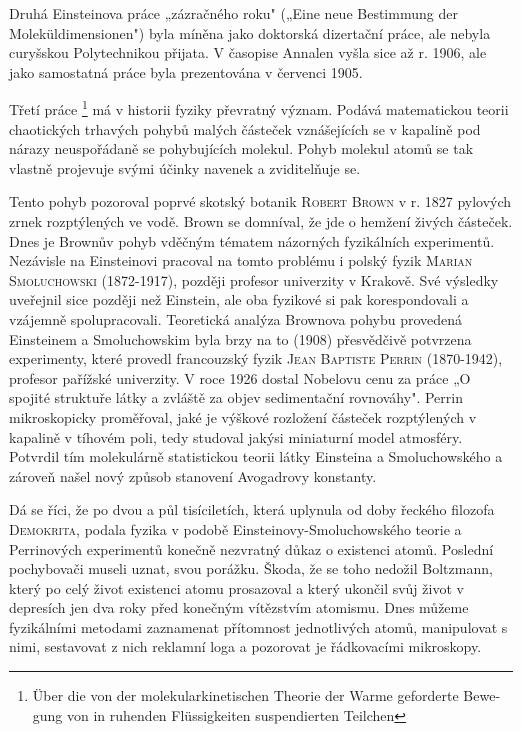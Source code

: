         Druhá Einsteinova práce „zázračného roku"  („Eine neue
        Bestimmung der Moleküldimensionen") byla míněna jako doktorská dizertační práce, ale nebyla
        curyšskou Polytechnikou přijata. V časopise Annalen vyšla sice až r. 1906, ale jako
        samostatná práce byla prezentována v červenci 1905.

        Třetí práce \emph{}\footnote{\foreignlanguage{ngerman}{Über die von der
        molekularkinetischen Theorie der Warme geforderte Bewegung von in ruhenden Flüssigkeiten
        suspendierten Teilchen}} \cite{Einstein1905} má v historii fyziky převratný význam. Podává
        matematickou teorii chaotických trhavých pohybů malých částeček vznášejících se v kapalině
        pod nárazy neuspořádaně se pohybujících molekul. Pohyb molekul atomů se tak vlastně
        projevuje svými účinky navenek a zviditelňuje se.

        Tento pohyb pozoroval poprvé skotský botanik \textsc{Robert Brown} v r. 1827 pylových zrnek
        rozptýlených ve vodě. Brown se domníval, že jde o hemžení živých částeček. Dnes je Brownův
        pohyb vděčným tématem názorných fyzikálních experimentů. Nezávisle na Einsteinovi pracoval
        na tomto problému i polský fyzik \textsc{Marian Smoluchowski} (1872-1917), později profesor
        univerzity v Krakově. Své výsledky uveřejnil sice později než Einstein, ale oba fyzikové si
        pak korespondovali a vzájemně spolupracovali. Teoretická analýza Brownova pohybu provedená
        Einsteinem a Smoluchowskim byla brzy na to (1908) přesvědčivě potvrzena experimenty, které
        provedl francouzský fyzik \textsc{Jean Baptiste Perrin} (1870-1942), profesor pařížské
        univerzity. V roce 1926 dostal Nobelovu cenu za práce „O spojité struktuře látky a zvláště
        za objev sedimentační rovnováhy". Perrin mikroskopicky proměřoval, jaké je výškové rozložení
        částeček rozptýlených v kapalině v tíhovém poli, tedy studoval jakýsi miniaturní model
        atmosféry. Potvrdil tím molekulárně statistickou teorii látky Einsteina a Smoluchowského a
        zároveň našel nový způsob stanovení Avogadrovy konstanty. 
        
        Dá se říci, že po dvou a půl tisíciletích, která uplynula od doby řeckého filozofa
        \textsc{Demokrita}, podala fyzika v podobě Einsteinovy-Smoluchowského teorie a Perrinových
        experimentů konečně nezvratný důkaz o existenci atomů. Poslední pochybovači museli uznat,
        svou porážku. Škoda, že se toho nedožil Boltzmann, který po celý život existenci atomu
        prosazoval a který ukončil svůj život v depresích jen dva roky před konečným vítězstvím
        atomismu. Dnes můžeme fyzikálními metodami zaznamenat přítomnost jednotlivých atomů,
        manipulovat s nimi, sestavovat z nich reklamní loga a pozorovat je řádkovacími mikroskopy.
        
